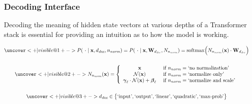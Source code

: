 \documentclass[aspectratio=169, 12pt]{beamer}
\newcommand{\gbm}[1]{\bm{\mathbf{#1}}} %
\begin{document}
    \subsubsection{Decoding Interface}
    \begin{frame}{}
        Decoding the meaning of hidden state vectors at various depths of a Transformer stack is essential for providing an intuition as to how the model is working.

        \begin{equation*}
        \begin{gathered}
            \uncover<+|visible@1+->{
                P(\ \cdot \mid \gbm{x}, d_{\textit{dec}}, n_{\textit{norm}}) = P(\ \cdot \mid \gbm{x}, \gbm{W}_{d_{\textit{dec}}}, N_{n_{\textit{norm}}}) = \operatorname{softmax}\Bigl(N_{n_{\textit{norm}}}(\gbm{x}) \cdot \gbm{W}_{d_{\textit{dec}}}\Bigr)
            }\\[15pt]
            \uncover<+|visible@2+->{
                N_{n_{\textit{norm}}}(\gbm{x}) = 
                \left\{
                \begin{array}{cl}
                    \gbm{x} &\ \text{if}\ n_{\textit{norm}} = \text{`no normalization'} \\
                    \mathcal{N}{(\gbm{x})} &\ \text{if}\ n_{\textit{norm}} = \text{`normalize only'} \\
                    \gbm{\gamma}_\ell \cdot \mathcal{N}{(\gbm{x})} + \gbm{\beta}_\ell &\ \text{if}\ n_{\textit{norm}} = \text{`normalize and scale'}
                \end{array}
                \right.
            }\\[15pt]
            \uncover<+|visible@3+->{
                d_{\textit{dec}} \in \bigl\{\text{`input'}, \text{`output'}, \text{`linear'}, \text{`quadratic'}, \text{`max-prob'} \bigr\}
            }\\
        \end{gathered}
        \end{equation*}
    \end{frame}
\end{document}
